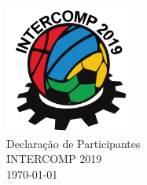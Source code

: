 \begin{center}

	\vspace*{\fill}
	{\let\clearpage\relax \includegraphics[width=120pt]{../logo.png} \\ [.5cm]}
	\Huge{Declaração de Participantes} \\ [.5cm]
	\Large{INTERCOMP 2019} \\ [.5cm]
	\normalsize{\today}
	\vspace*{\fill}

\end{center}
